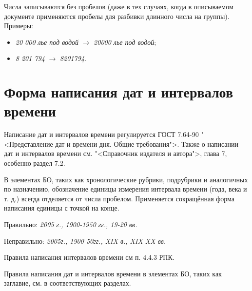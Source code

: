 Числа записываются без пробелов (даже в тех случаях, когда в описываемом документе применяются пробелы для разбивки длинного числа на группы). Примеры:

\begin{itemize}
	\item \textit{20 000 лье под водой} $\rightarrow$ \textit{20000 лье под водой};
	\item \textit{8 201 794} $\rightarrow$ \textit{8201794}.
\end{itemize}

\section{Форма написания дат и интервалов времени}

Написание дат и интервалов времени регулируется ГОСТ 7.64-90 "<Представление дат и времени дня. Общие требования">. Также о написании дат и интервалов времени см. "<Справочник издателя и автора">, глава 7, особенно раздел 7.2.

В элементах БО, таких как хронологические рубрики, подрубрики и аналогичных по назначению, обозначение единицы измерения интервала времени (года, века и т. д.) всегда отделяется от числа пробелом. Применяется сокращённая форма написания единицы с точкой на конце.

Правильно: \textit{2005 г., 1900-1950 гг., 19-20 вв.}

Неправильно: \textit{2005г., 1900-50гг., XIX в., XIX-XX вв.}

Правила написания интервалов времени см п. 4.4.3 РПК.

Правила написания дат и интервалов времени в элементах БО, таких как заглавие, см. в соответствующих разделах.
